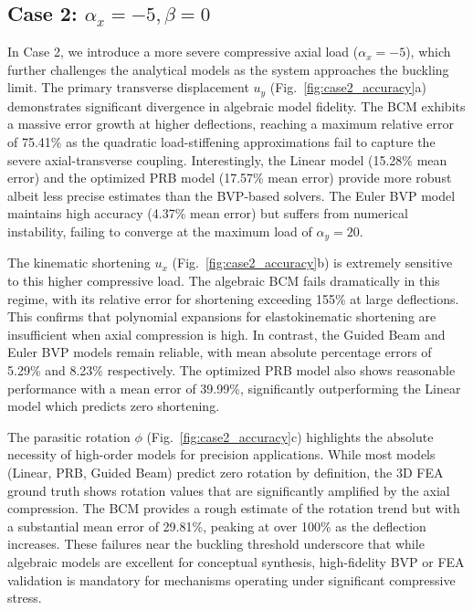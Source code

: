 \documentclass[colorlinks,upint,subscriptcorrection,varvw,hyphenate,balance]{asmeconf} %
\begin{document}
\subsection{Case 2: \texorpdfstring{$\alpha_x = -5, \beta = 0$}{alpha_x = -5, beta = 0}}
In Case 2, we introduce a more severe compressive axial load ($\alpha_x = -5$), which further challenges the analytical models as the system approaches the buckling limit. The primary transverse displacement $u_y$ (Fig.~\ref{fig:case2_accuracy}a) demonstrates significant divergence in algebraic model fidelity. The BCM exhibits a massive error growth at higher deflections, reaching a maximum relative error of 75.41\% as the quadratic load-stiffening approximations fail to capture the severe axial-transverse coupling. Interestingly, the Linear model (15.28\% mean error) and the optimized PRB model (17.57\% mean error) provide more robust albeit less precise estimates than the BVP-based solvers. The Euler BVP model maintains high accuracy (4.37\% mean error) but suffers from numerical instability, failing to converge at the maximum load of $\alpha_y = 20$.

The kinematic shortening $u_x$ (Fig.~\ref{fig:case2_accuracy}b) is extremely sensitive to this higher compressive load. The algebraic BCM fails dramatically in this regime, with its relative error for shortening exceeding 155\% at large deflections. This confirms that polynomial expansions for elastokinematic shortening are insufficient when axial compression is high. In contrast, the Guided Beam and Euler BVP models remain reliable, with mean absolute percentage errors of 5.29\% and 8.23\% respectively. The optimized PRB model also shows reasonable performance with a mean error of 39.99\%, significantly outperforming the Linear model which predicts zero shortening.

The parasitic rotation $\phi$ (Fig.~\ref{fig:case2_accuracy}c) highlights the absolute necessity of high-order models for precision applications. While most models (Linear, PRB, Guided Beam) predict zero rotation by definition, the 3D FEA ground truth shows rotation values that are significantly amplified by the axial compression. The BCM provides a rough estimate of the rotation trend but with a substantial mean error of 29.81\%, peaking at over 100\% as the deflection increases. These failures near the buckling threshold underscore that while algebraic models are excellent for conceptual synthesis, high-fidelity BVP or FEA validation is mandatory for mechanisms operating under significant compressive stress.
\end{document}
